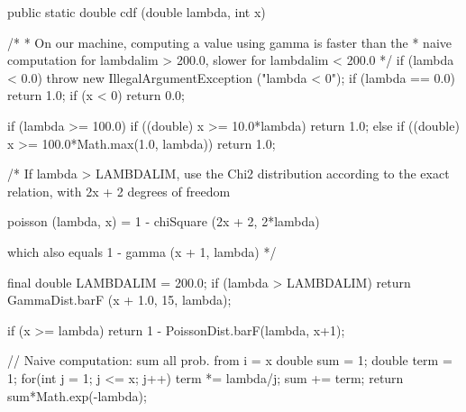 \begin{code}

   public static double cdf (double lambda, int x)\begin{hide} {
   /*
    * On our machine, computing a value using gamma is faster than the
    * naive computation for lambdalim > 200.0, slower for lambdalim < 200.0
    */
      if (lambda < 0.0)
        throw new IllegalArgumentException ("lambda < 0");
      if (lambda == 0.0)
         return 1.0;
      if (x < 0)
         return 0.0;

      if (lambda >= 100.0) {
         if ((double) x >= 10.0*lambda)
            return 1.0;
      } else {
         if ((double) x >= 100.0*Math.max(1.0, lambda))
            return 1.0;
      }

      /* If lambda > LAMBDALIM, use the Chi2 distribution according to the
         exact relation, with 2x + 2 degrees of freedom

         poisson (lambda, x) = 1 - chiSquare (2x + 2, 2*lambda)

         which also equals 1 - gamma (x + 1, lambda) */

      final double LAMBDALIM = 200.0;
      if (lambda > LAMBDALIM)
         return GammaDist.barF (x + 1.0, 15, lambda);

      if (x >= lambda)
         return 1 - PoissonDist.barF(lambda, x+1);

      // Naive computation: sum all prob. from i = x
      double sum = 1;
      double term = 1;
      for(int j = 1; j <= x; j++) {
         term *= lambda/j;
         sum += term;
      }
      return sum*Math.exp(-lambda);
   }\end{hide}
\end{code}
